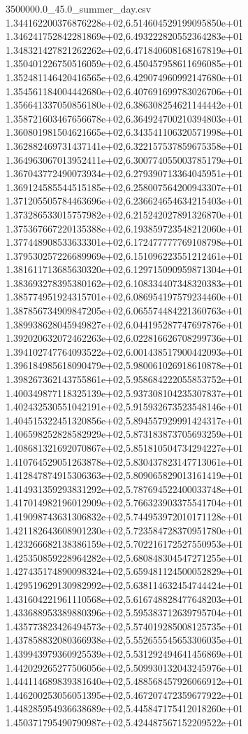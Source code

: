 \begin{filecontents*}{3500000.0_45.0_summer_day.csv}
1.344162200376876228e+02,6.514604529199095850e+01
1.346241752842281869e+02,6.493222820552364283e+01
1.348321427821262262e+02,6.471840608168167819e+01
1.350401226750516059e+02,6.450457958611696085e+01
1.352481146420416565e+02,6.429074960992147680e+01
1.354561184004442680e+02,6.407691699783026706e+01
1.356641337050856180e+02,6.386308254621144442e+01
1.358721603467656678e+02,6.364924700210394803e+01
1.360801981504621665e+02,6.343541106320571998e+01
1.362882469731437141e+02,6.322157537859675358e+01
1.364963067013952411e+02,6.300774055003785179e+01
1.367043772490073934e+02,6.279390713364045951e+01
1.369124585544515185e+02,6.258007564200943307e+01
1.371205505784463696e+02,6.236624654634215403e+01
1.373286533015757982e+02,6.215242027891326870e+01
1.375367667220135388e+02,6.193859723548212060e+01
1.377448908533633301e+02,6.172477777769108798e+01
1.379530257226689969e+02,6.151096223551212461e+01
1.381611713685630320e+02,6.129715090959871304e+01
1.383693278395380162e+02,6.108334407348320383e+01
1.385774951924315701e+02,6.086954197579234460e+01
1.387856734909847205e+02,6.065574484221360763e+01
1.389938628045949827e+02,6.044195287747697876e+01
1.392020632072462263e+02,6.022816626708299736e+01
1.394102747764093522e+02,6.001438517900442093e+01
1.396184985618090479e+02,5.980061026918610878e+01
1.398267362143755861e+02,5.958684222055853752e+01
1.400349877118325139e+02,5.937308104235307837e+01
1.402432530551042191e+02,5.915932673523548146e+01
1.404515322451320856e+02,5.894557929991424317e+01
1.406598252828582929e+02,5.873183873705693259e+01
1.408681321692070867e+02,5.851810504734294227e+01
1.410764529051263878e+02,5.830437823147713061e+01
1.412847874915306363e+02,5.809065829013161419e+01
1.414931359293831292e+02,5.787694522400033748e+01
1.417014982196012909e+02,5.766323903375541704e+01
1.419098743631306832e+02,5.744953972010171128e+01
1.421182643608901230e+02,5.723584728370951780e+01
1.423266682138386159e+02,5.702216172527550953e+01
1.425350859228964282e+02,5.680848304547271255e+01
1.427435174890098324e+02,5.659481124500052829e+01
1.429519629130982992e+02,5.638114632454744424e+01
1.431604221961110568e+02,5.616748828477648203e+01
1.433688953389880396e+02,5.595383712639795704e+01
1.435773823426494573e+02,5.574019285008125735e+01
1.437858832080366938e+02,5.552655545653306035e+01
1.439943979360925539e+02,5.531292494641456869e+01
1.442029265277506056e+02,5.509930132043245976e+01
1.444114689839381640e+02,5.488568457926066912e+01
1.446200253056051395e+02,5.467207472359677922e+01
1.448285954936638689e+02,5.445847175412018260e+01
1.450371795490790987e+02,5.424487567152209522e+01

\end{filecontents*}
